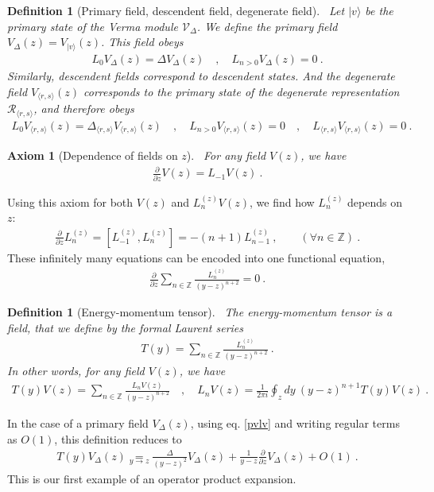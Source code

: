 \documentclass[12pt, a4paper]{article}
\theoremstyle{break}
\newtheorem{hyp}[exo]{Axiom}
\newtheorem{defn}[exo]{Definition}
\begin{document}
\begin{defn}[Primary field, descendent field, degenerate field]
~\label{def:pfdf}
Let $|v\rangle$ be the primary state of the Verma module $\mathcal V_\Delta$.
We define the primary field $V_\Delta(z)=V_{|v\rangle}(z)$. This field obeys
\begin{align}
 L_0 V_\Delta(z) = \Delta V_\Delta(z) \quad , \quad  L_{n> 0} V_\Delta(z) = 0 \ .
\end{align}
Similarly, descendent fields correspond to descendent states. And the degenerate field $V_{\langle r,s\rangle}(z)$ corresponds to the primary state of the degenerate representation $\mathcal{R}_{\langle r,s\rangle}$, and therefore obeys 
\begin{align}
L_0 V_{\langle r,s\rangle}(z) = \Delta_{\langle r,s\rangle} V_{\langle r,s\rangle}(z) \quad , \quad  L_{n> 0} V_{\langle r,s\rangle}(z) = 0 \quad , \quad L_{\langle r, s\rangle} V_{\langle r,s\rangle}(z) = 0\ .
\end{align}
\end{defn}

\begin{hyp}[Dependence of fields on $z$]
 ~\label{hyp:geom}
 For any field $V(z)$, we have 
 \begin{align}
  \frac{\partial}{\partial z} V(z) = L_{-1} V(z)  \ .
  \label{pvlv}
 \end{align}
\end{hyp}
Using this axiom for both $V(z)$ and $L_n^{(z)}V(z)$, we find how $L_n^{(z)}$ depends on $z$:
\begin{align}
 \frac{\partial}{\partial z} L_n^{(z)} = [L_{-1}^{(z)},L_n^{(z)}]= -(n+1)L_{n-1}^{(z)}\ ,\qquad (\forall n\in\mathbb{Z})\ .
\end{align}
These infinitely many equations can be encoded into one functional equation,
\begin{align}
 \frac{\partial}{\partial z} \sum_{n\in\mathbb{Z}} \frac{L_n^{(z)}}{(y-z)^{n+2}} = 0\ .
\end{align}

\begin{defn}[Energy-momentum tensor]
 ~\label{def:em}
 The energy-momentum tensor is a field, that we define by the formal Laurent series
 \begin{align}
  T(y) = \sum_{n\in\mathbb{Z}} \frac{L_n^{(z)}}{(y-z)^{n+2}} \ .
 \end{align}
In other words, for any field $V(z)$, we have 
\begin{align}
 T(y)V(z) = \sum_{n\in\mathbb{Z}} \frac{L_n V(z)}{(y-z)^{n+2}}\quad , \quad L_n V(z) = \frac{1}{2\pi i} \oint_{z}dy\ (y-z)^{n+1} T(y)V(z)\ .
 \label{eq:lvtv}
\end{align}
\end{defn}
In the case of a primary field $V_\Delta(z)$, using eq. \eqref{pvlv} and writing regular terms as $O(1)$, this definition reduces to
\begin{align}
 T(y)V_\Delta(z) \underset{y\to z}{=} \frac{\Delta}{(y-z)^2} V_\Delta(z) + \frac{1}{y-z} \frac{\partial}{\partial z} V_\Delta(z) + O(1)\ . 
 \label{eq:tvd}
\end{align}
This is our first example of an operator product expansion.
\end{document}
